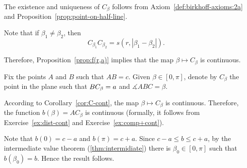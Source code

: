 The existence and uniqueness of $C_\beta$ follows from Axiom~\ref{def:birkhoff-axioms:2a} and Proposition~\ref{prop:point-on-half-line}.

Note that if $\beta_1\ne\beta_2$, then
$$C_{\beta_1}C_{\beta_2}=s(r,|\beta_1-\beta_2|).$$

Therefore, Proposition~\ref{prop:f(r,a)} implies that  the map $\beta\mapsto C_\beta$ is continuous.
\qeds





\label{page:proof:thm:abc}
Fix the points $A$ and $B$ such that $AB=c$.
Given $\beta\in [0,\pi]$,
denote by $C_\beta$ the point in the plane such that $BC_\beta\z=a$ and $\measuredangle ABC=\beta$.

According to Corollary~\ref{cor:C-cont},
the map
$\beta\mapsto C_\beta$ is continuous.
Therefore, the function $b(\beta)=AC_\beta$ is continuous
(formally, it follows from Exercise~\ref{ex:dist-cont} and Exercise~\ref{ex:comp+cont}).

Note that $b(0)=c-a$ and $b(\pi)=c+a$.
Since $c-a\le b\le c+a$,
by the intermediate value theorem (\ref{thm:intermidiate})
there is $\beta_0\in[0,\pi]$ such that
$b(\beta_0)=b$.
Hence the result follows. 
\qeds



